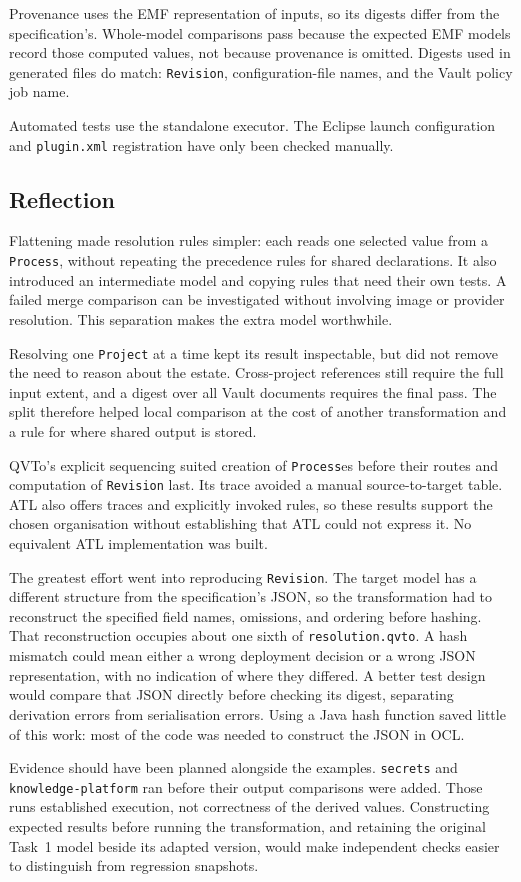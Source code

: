 Provenance uses the EMF representation of inputs, so its digests differ
from the specification's. Whole-model comparisons pass because the expected
EMF models record those computed values, not because provenance is omitted.
Digests used in generated files do match: \texttt{Revision}, configuration-file
names, and the Vault policy job name.

Automated tests use the standalone executor. The Eclipse launch
configuration and \texttt{plugin.xml} registration have only been checked
manually.

\subsection{Reflection}
\label{sec:reflection}

Flattening made resolution rules simpler: each reads one selected value
from a \texttt{Process}, without repeating the precedence rules for shared
declarations. It also introduced an intermediate model and copying rules
that need their own tests. A failed merge comparison can be investigated
without involving image or provider resolution. This separation makes the
extra model worthwhile.

Resolving one \texttt{Project} at a time kept its result inspectable, but
did not remove the need to reason about the estate. Cross-project references
still require the full input extent, and a digest over all Vault documents
requires the final pass. The split therefore helped local comparison at the
cost of another transformation and a rule for where shared output is stored.

QVTo's explicit sequencing suited creation of \texttt{Process}es before
their routes and computation of \texttt{Revision} last. Its trace avoided a
manual source-to-target table. ATL also offers traces and explicitly invoked
rules, so these results support the chosen organisation without establishing
that ATL could not express it. No equivalent ATL implementation was built.

The greatest effort went into reproducing \texttt{Revision}. The
target model has a different structure from the specification's JSON, so
the transformation had to reconstruct the specified field
names, omissions, and ordering before hashing. That reconstruction occupies
about one sixth of \texttt{resolution.qvto}. A hash mismatch could mean
either a wrong deployment decision or a wrong JSON representation, with no
indication of where they differed. A better test design would compare that
JSON directly before checking its digest, separating derivation errors from
serialisation errors. Using a Java hash function saved little of this
work: most of the code was needed to construct the JSON in OCL.

Evidence should have been planned alongside the examples.
\texttt{secrets} and \texttt{knowledge-platform} ran before their output
comparisons were added. Those runs established execution, not correctness
of the derived values. Constructing expected results before running the
transformation, and
retaining the original Task~1 model beside its adapted version, would make
independent checks easier to distinguish from regression snapshots.
